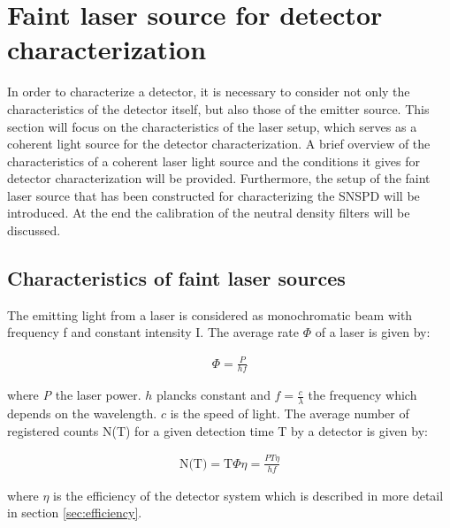 
\chapter{Faint laser source for detector characterization}
\label{sec:SNSPD_setup}

In order to characterize a detector, it is necessary to consider not only the characteristics of the detector itself,
but also those of the emitter source.
This section will focus on the characteristics of the laser setup, which serves as a coherent light source for the detector
characterization.
A brief overview of the characteristics of a coherent laser light source and the conditions it gives
for detector characterization will be provided.
Furthermore, the setup of the faint laser source that has been constructed for characterizing the SNSPD will be introduced.
At the end the calibration of the neutral density filters will be discussed.

\section{Characteristics of faint laser sources}\label{sec:characteristics_faint laser sources}


The emitting light from a laser is considered as monochromatic beam with frequency f
and constant intensity I. The average rate $\Phi$ of a laser is given by:

\begin{align}
    \Phi = \frac{P}{h f}
\end{align}

where \textit{P} the laser power. $h$ plancks constant and $f = \frac{c}{\lambda}$ the frequency which
depends on the wavelength.
$c$ is the speed of light.
The average number of registered counts N(T) for a given detection time T by a detector is given by:

\begin{align}
    \text{N(T)} = \text{T} \Phi \eta= \frac{P T \eta}{h f}
\end{align}

where \textit{$\eta$} is the efficiency of the detector system which is described in more detail in section \ref{sec:efficiency}.

